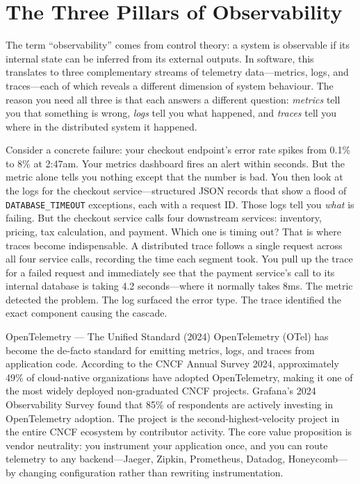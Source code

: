 \documentclass[11pt,a4paper]{article}
\begin{document}
\section{The Three Pillars of Observability}

The term ``observability'' comes from control theory: a system is observable if its internal state can be inferred from its external outputs. In software, this translates to three complementary streams of telemetry data---metrics, logs, and traces---each of which reveals a different dimension of system behaviour. The reason you need all three is that each answers a different question: \emph{metrics} tell you that something is wrong, \emph{logs} tell you what happened, and \emph{traces} tell you where in the distributed system it happened.

Consider a concrete failure: your checkout endpoint's error rate spikes from 0.1\% to 8\% at 2:47am. Your metrics dashboard fires an alert within seconds. But the metric alone tells you nothing except that the number is bad. You then look at the logs for the checkout service---structured JSON records that show a flood of \texttt{DATABASE\_TIMEOUT} exceptions, each with a request ID. Those logs tell you \emph{what} is failing. But the checkout service calls four downstream services: inventory, pricing, tax calculation, and payment. Which one is timing out? That is where traces become indispensable. A distributed trace follows a single request across all four service calls, recording the time each segment took. You pull up the trace for a failed request and immediately see that the payment service's call to its internal database is taking 4.2 seconds---where it normally takes 8ms. The metric detected the problem. The log surfaced the error type. The trace identified the exact component causing the cascade.

\begin{industrybox}{OpenTelemetry --- The Unified Standard (2024)}
  OpenTelemetry (OTel) has become the de-facto standard for emitting metrics, logs, and traces from application code. According to the CNCF Annual Survey 2024, approximately 49\% of cloud-native organizations have adopted OpenTelemetry, making it one of the most widely deployed non-graduated CNCF projects. Grafana's 2024 Observability Survey found that 85\% of respondents are actively investing in OpenTelemetry adoption. The project is the second-highest-velocity project in the entire CNCF ecosystem by contributor activity. The core value proposition is vendor neutrality: you instrument your application once, and you can route telemetry to any backend---Jaeger, Zipkin, Prometheus, Datadog, Honeycomb---by changing configuration rather than rewriting instrumentation.
\end{industrybox}
\end{document}
